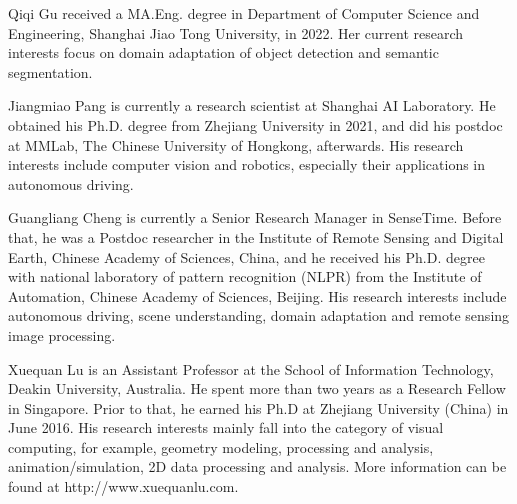 \documentclass[journal]{IEEEtran}
\begin{document}
{\begin{minipage}{\textwidth}
\vspace{-1cm}
\begin{IEEEbiography}{Qiqi Gu}
received a MA.Eng. degree in Department of Computer Science and Engineering, Shanghai Jiao Tong University, in 2022. Her current research interests focus on domain adaptation of object detection and semantic segmentation.
\end{IEEEbiography}

\vspace{-1cm}

\begin{IEEEbiography}{Jiangmiao Pang} is currently a research scientist at Shanghai AI Laboratory. He obtained his Ph.D. degree from Zhejiang University in 2021, and did his postdoc at MMLab, The Chinese University of Hongkong, afterwards. His research interests include computer vision and robotics, especially their applications in autonomous driving.
\end{IEEEbiography}

\vspace{-1cm}

\begin{IEEEbiography}{Guangliang Cheng}
is currently a Senior Research Manager in SenseTime. Before that, he was a Postdoc researcher in the Institute of Remote Sensing and Digital Earth, Chinese Academy of Sciences, China, and he received his Ph.D. degree with national laboratory of pattern recognition (NLPR) from the Institute of Automation, Chinese Academy of Sciences, Beijing. His research interests include autonomous driving, scene understanding, domain adaptation and remote sensing image processing.
\end{IEEEbiography}

\vspace{-1cm}

\begin{IEEEbiography}{Xuequan Lu}
is an Assistant Professor at the School of Information Technology, Deakin University, Australia. He spent more than two years as a Research Fellow in Singapore. Prior to that, he earned his Ph.D at Zhejiang University (China) in June 2016. His research interests mainly fall into the category of visual computing, for example, geometry modeling, processing and analysis, animation/simulation, 2D data processing and analysis. More information can be found at http://www.xuequanlu.com.
\end{IEEEbiography}


\end{minipage}}
\end{document}
